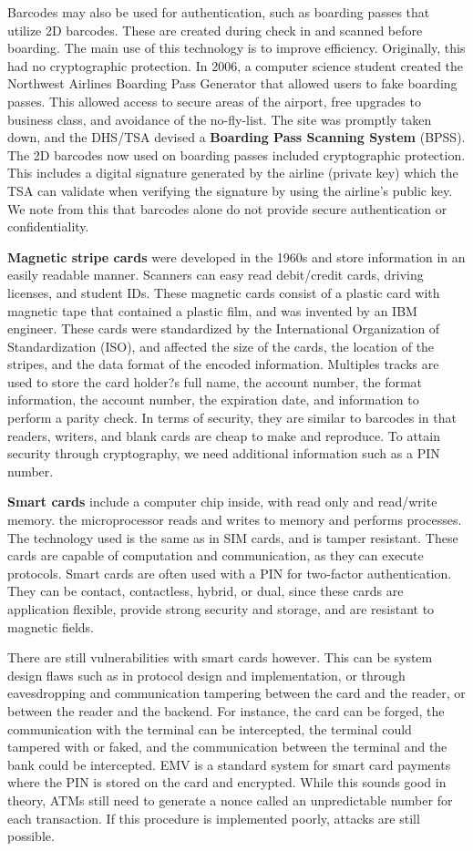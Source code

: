 \documentclass[11pt]{article}
\theoremstyle{plain} %
\theoremstyle{definition}
\theoremstyle{example}
\theoremstyle{remark}
\begin{document}
Barcodes may also be used for authentication, such as boarding passes that utilize 2D barcodes. These are created during check in and scanned before boarding. The main use of this technology is to improve efficiency. Originally, this had no cryptographic protection. In 2006, a computer science student created the Northwest Airlines Boarding Pass Generator that allowed users to fake boarding passes. This allowed access to secure areas of the airport, free upgrades to business class, and avoidance of the no-fly-list. The site was promptly taken down, and the DHS/TSA devised a \textbf{Boarding Pass Scanning System} (BPSS). The 2D barcodes now used on boarding passes included cryptographic protection. This includes a digital signature generated by the airline (private key) which the TSA can validate when verifying the signature by using the airline's public key. We note from this that barcodes alone do not provide secure authentication or confidentiality. 

\textbf{Magnetic stripe cards} were developed in the 1960s and store information in an easily readable manner. Scanners can easy read debit/credit cards, driving licenses, and student IDs. These magnetic cards consist of a plastic card with magnetic tape that contained a plastic film, and was invented by an IBM engineer. These cards were standardized by the International Organization of Standardization (ISO), and affected the size of the cards, the location of the stripes, and the data format of the encoded information. Multiples tracks are used to store the card holder?s full name, the account number, the format information, the account number, the expiration date, and information to perform a parity check. In terms of security, they are similar to barcodes in that readers, writers, and blank cards are cheap to make and reproduce. To attain security through cryptography, we need additional information such as a PIN number. 

\textbf{Smart cards} include a computer chip inside, with read only and read/write memory. the microprocessor reads and writes to memory and performs processes. The technology used is the same as in SIM cards, and is tamper resistant. These cards are capable of computation and communication, as they can execute protocols. Smart cards are often used with a PIN for two-factor authentication. They can be contact, contactless, hybrid, or dual, since these cards are application flexible, provide strong security and storage, and are resistant to magnetic fields. 

There are still vulnerabilities with smart cards however. This can be system design flaws such as in protocol design and implementation, or through eavesdropping and communication tampering between the card and the reader, or between the reader and the backend. For instance, the card can be forged, the communication with the terminal can be intercepted, the terminal could tampered with or faked, and the communication between the terminal and the bank could be intercepted. EMV is a standard system for smart card payments where the PIN is stored on the card and encrypted. While this sounds good in theory, ATMs still need to generate a nonce called an unpredictable number for each transaction. If this procedure is implemented poorly, attacks are still possible. 
\end{document}
